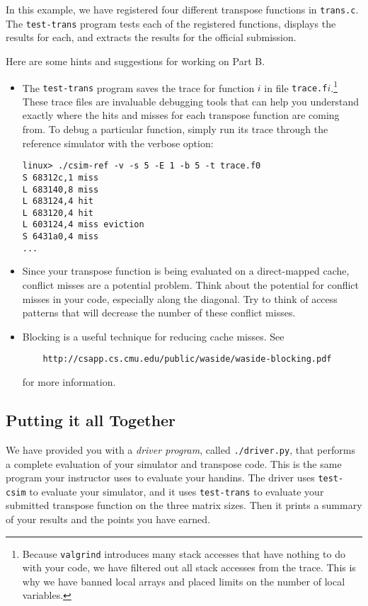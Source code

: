 \documentclass[11pt]{article}
\begin{document}
In this example, we have registered four different transpose
functions in {\tt trans.c}. The \verb:test-trans: program tests each
of the registered functions, displays the results for each, and
extracts the results for the official submission.

Here are some hints and suggestions for working on Part B.
\begin{itemize}
\item The {\tt test-trans} program saves the trace for function $i$ in
  file {\tt trace.f}$i$.\footnote{Because {\tt valgrind} introduces
    many stack accesses that have nothing to do with your code, we
    have filtered out all stack accesses from the trace. This is why
    we have banned local arrays and placed limits on the number of
    local variables.} These trace files are invaluable debugging tools
  that can help you understand exactly where the hits and misses for
  each transpose function are coming from. To debug a particular
  function, simply run its trace through the reference simulator with
  the verbose option:
\begin{verbatim}
linux> ./csim-ref -v -s 5 -E 1 -b 5 -t trace.f0
S 68312c,1 miss 
L 683140,8 miss 
L 683124,4 hit 
L 683120,4 hit 
L 603124,4 miss eviction 
S 6431a0,4 miss 
...
\end{verbatim}

\item Since your transpose function is being evaluated on a
  direct-mapped cache, conflict misses are a potential problem.  Think
  about the potential for conflict misses in your code, especially
  along the diagonal. Try to think of access patterns that will
  decrease the number of these conflict misses.

\item Blocking is a useful technique for reducing cache misses. See  
\begin{verbatim}
    http://csapp.cs.cmu.edu/public/waside/waside-blocking.pdf
\end{verbatim}
for more information.

\end{itemize}

\subsection{Putting it all Together}

We have provided you with a {\em driver program}, called
\verb+./driver.py+, that performs a complete evaluation of your
simulator and transpose code. This is the same program your instructor
uses to evaluate your handins. The driver uses {\tt test-csim}
to evaluate your simulator, and it uses {\tt test-trans} to evaluate
your submitted transpose function on the three matrix sizes. Then it
prints a summary of your results and the points you have earned. 
\end{document}
